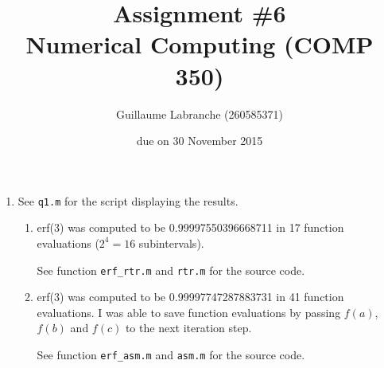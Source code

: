 \documentclass{article}
\author{Guillaume Labranche (260585371)}
\title{Assignment \#6\\Numerical Computing (COMP 350)}
\date{due on 30 November 2015}
\begin{document}
\maketitle

\begin{enumerate}
\item 
See \texttt{q1.m} for the script displaying the results.
\begin{enumerate}
\item erf(3) was computed to be  0.99997550396668711 in 17 function evaluations ($2^4=16$ subintervals).

See function \texttt{erf\_rtr.m} and \texttt{rtr.m} for the source code.

\item erf(3) was computed to be 0.99997747287883731 in 41 function evaluations. I was able to save function evaluations by passing $f(a)$, $f(b)$ and $f(c)$ to the next iteration step.

See function \texttt{erf\_asm.m} and \texttt{asm.m} for the source code.
\end{enumerate}

\end{enumerate}
\end{document}
